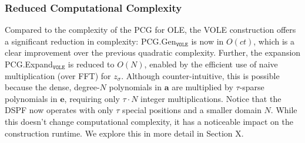 \subsubsection{Reduced Computational Complexity}
Compared to the complexity of the PCG for OLE, the VOLE construction offers a significant reduction in complexity: PCG.Gen$_{\texttt{VOLE}}$ is now in $O(ct)$, which is a clear improvement over the previous quadratic complexity. Further, the expansion PCG.Expand$_{\texttt{VOLE}}$ is reduced to $O(N)$, enabled by the efficient use of naive multiplication (over FFT) for $z_\sigma$. Although counter-intuitive, this is possible because the dense, degree-$N$ polynomials in $\boldsymbol{a}$ are multiplied by $\tau$-sparse polynomials in $\boldsymbol{e}$, requiring only $\tau \cdot N$ integer multiplications. Notice that the DSPF now operates with only $\tau$ special positions and a smaller domain $N$. While this doesn't change computational complexity, it has a noticeable impact on the construction runtime. We explore this in more detail in Section \todo X.